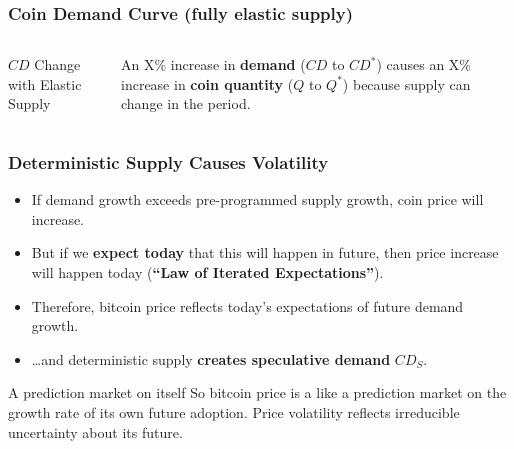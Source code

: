 \documentclass{beamer}
\begin{document}
\begin{frame}
  \frametitle{Coin Demand Curve (fully elastic supply)}
  \begin{columns}
      \begin{block}{$CD$ Change with Elastic Supply}
      \end{block}
    An X\% increase in \textbf{demand} ($CD$ to $CD^{*}$) causes an
    X\% increase in \textbf{coin quantity} ($Q$ to $Q^{*}$) because
    supply can change in the period.
  \end{columns}
\end{frame}

\begin{frame}
  \frametitle{Deterministic Supply Causes Volatility}
  \begin{itemize}
  \item If demand growth exceeds pre-programmed supply
    growth, coin price will increase.
  \item But if we \textbf{expect today} that this will happen in
    future, then price increase will happen today (\textbf{``Law of
      Iterated Expectations''}).
  \item Therefore, bitcoin price reflects today's expectations of
    future demand growth.
  \item \dots and deterministic supply \textbf{creates speculative
      demand} $CD_{S}$.
  \end{itemize}

  \begin{block}{A prediction market on itself}
    So bitcoin price is a like a prediction market on the growth rate
    of its own future adoption. Price volatility reflects irreducible
    uncertainty about its future. 
  \end{block}
\end{frame}
\end{document}
